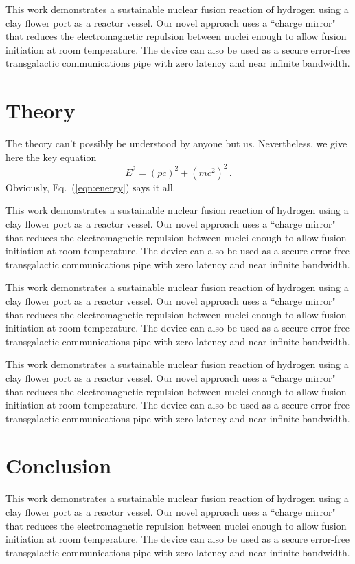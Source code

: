 This work demonstrates a sustainable nuclear fusion reaction of hydrogen 
using a clay flower port as a reactor vessel. Our novel approach uses
a ``charge mirror" that reduces the electromagnetic repulsion between 
nuclei enough to allow fusion initiation at room temperature.
The device can also be used as a secure error-free transgalactic communications
pipe with zero latency and near infinite bandwidth.   

\section{\label{sec:theory}Theory}
The theory can't possibly be understood by anyone but us.  
Nevertheless, we give here the key equation
\begin{equation}
\label{eqn:energy}
E^2=(pc)^2+(mc^2)^2\,.
\end{equation}
Obviously, Eq.~(\ref{eqn:energy}) says it all.

This work demonstrates a sustainable nuclear fusion reaction of hydrogen 
using a clay flower port as a reactor vessel. Our novel approach uses
a ``charge mirror" that reduces the electromagnetic repulsion between 
nuclei enough to allow fusion initiation at room temperature.
The device can also be used as a secure error-free transgalactic communications
pipe with zero latency and near infinite bandwidth.   

This work demonstrates a sustainable nuclear fusion reaction of hydrogen 
using a clay flower port as a reactor vessel. Our novel approach uses
a ``charge mirror" that reduces the electromagnetic repulsion between 
nuclei enough to allow fusion initiation at room temperature.
The device can also be used as a secure error-free transgalactic communications
pipe with zero latency and near infinite bandwidth.   

This work demonstrates a sustainable nuclear fusion reaction of hydrogen 
using a clay flower port as a reactor vessel. Our novel approach uses
a ``charge mirror" that reduces the electromagnetic repulsion between 
nuclei enough to allow fusion initiation at room temperature.
The device can also be used as a secure error-free transgalactic communications
pipe with zero latency and near infinite bandwidth.   

\section{\label{sec:conclusion}Conclusion}
This work demonstrates a sustainable nuclear fusion reaction of hydrogen 
using a clay flower port as a reactor vessel. Our novel approach uses
a ``charge mirror" that reduces the electromagnetic repulsion between 
nuclei enough to allow fusion initiation at room temperature.
The device can also be used as a secure error-free transgalactic communications
pipe with zero latency and near infinite bandwidth.   
